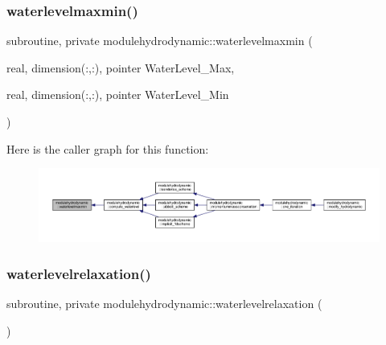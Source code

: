 \subsubsection{\texorpdfstring{waterlevelmaxmin()}{waterlevelmaxmin()}}
{\footnotesize\ttfamily subroutine, private modulehydrodynamic\+::waterlevelmaxmin (\begin{DoxyParamCaption}\item[{real, dimension(\+:,\+:), pointer}]{Water\+Level\+\_\+\+Max,  }\item[{real, dimension(\+:,\+:), pointer}]{Water\+Level\+\_\+\+Min }\end{DoxyParamCaption})\hspace{0.3cm}{\ttfamily [private]}}

Here is the caller graph for this function\+:\nopagebreak
\begin{figure}[H]
\begin{center}
\leavevmode
\includegraphics[width=350pt]{namespacemodulehydrodynamic_a4c31b8fb87415bace90b12dd41376ef4_icgraph}
\end{center}
\end{figure}
\mbox{\label{namespacemodulehydrodynamic_af6e5fcf3d54f676a11ab22c650353cef}} 
\subsubsection{\texorpdfstring{waterlevelrelaxation()}{waterlevelrelaxation()}}
{\footnotesize\ttfamily subroutine, private modulehydrodynamic\+::waterlevelrelaxation (\begin{DoxyParamCaption}{ }\end{DoxyParamCaption})\hspace{0.3cm}{\ttfamily [private]}}

